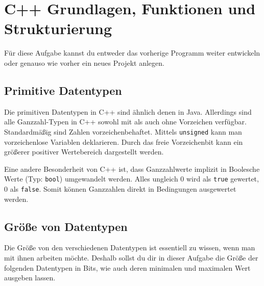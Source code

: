 \section{\ExercisePrefixBasics C++ Grundlagen, Funktionen und Strukturierung}
Für diese Aufgabe kannst du entweder das vorherige Programm weiter entwickeln oder genauso wie vorher ein neues Projekt anlegen.

\subsection*{Primitive Datentypen} 
Die primitiven Datentypen in C++ sind ähnlich denen in Java.
Allerdings sind alle Ganzzahl-Typen in C++ sowohl mit als auch ohne Vorzeichen verfügbar.
Standardmäßig sind Zahlen vorzeichenbehaftet.
Mittels \lstinline{unsigned} kann man vorzeichenlose Variablen deklarieren.
Durch das freie Vorzeichenbit kann ein größerer positiver Wertebereich dargestellt werden.



Eine andere Besonderheit von C++ ist, dass Ganzzahlwerte implizit in Boolesche Werte (Typ: \lstinline{bool}) umgewandelt werden.
Alles ungleich 0 wird als \lstinline{true} gewertet, 0 als \lstinline{false}.
Somit können Ganzzahlen direkt in Bedingungen ausgewertet werden.

\subsection{Größe von Datentypen}
Die Größe von den verschiedenen Datentypen ist essentiell zu wissen, wenn man mit ihnen arbeiten möchte.
Deshalb sollst du dir in dieser Aufgabe die Größe der folgenden Datentypen in Bits, wie auch deren minimalen und maximalen Wert ausgeben lassen.




